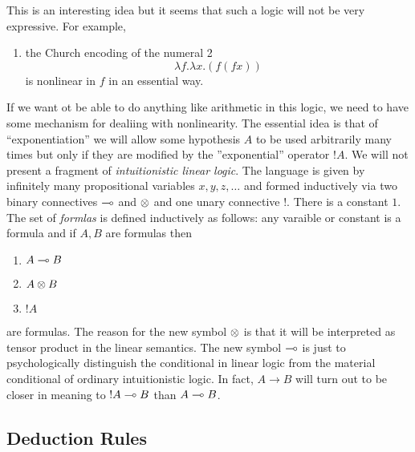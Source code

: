 \documentclass[12pt]{article}
\begin{document}
This is an interesting idea but it seems that such a logic will not be very expressive. For example, 
\begin{enumerate}
\item the Church encoding of the numeral 2
\[ \lambda f . \lambda x . (f (f x)) \] 
is nonlinear in $f$ in an essential way.
\end{enumerate}
If we want ot be able to do anything like arithmetic in this logic, we need to have some mechanism for dealiing with nonlinearity. The essential idea is that of ``exponentiation'' we will allow some hypothesis $A$ to be used arbitrarily many times but only if they are modified by the ''exponential'' operator $!A$. We will not present a fragment of \textit{intuitionistic linear logic}. The language is given by infinitely many propositional variables $x, y, z, \dots$ and formed inductively via two binary connectives $\multimap$ and $\otimes$ and one unary connective $!$. There is a constant $1$. The set of \textit{formlas} is defined inductively as follows: any varaible or constant is a formula and if $A, B$ are formulas then
\begin{enumerate}
\item $A \multimap B$
\item $A \otimes B$
\item $!A$ 
\end{enumerate}
are formulas. The reason for the new symbol $\otimes$ is that it will be interpreted as tensor product in the linear semantics. The new symbol $\multimap$ is just to psychologically distinguish the conditional in linear logic from the material conditional of ordinary intuitionistic logic. In fact, $A \to B$ will turn out to be closer in meaning to $! A \multimap B$ than $A \multimap B$.

\subsection{Deduction Rules}
\end{document}
